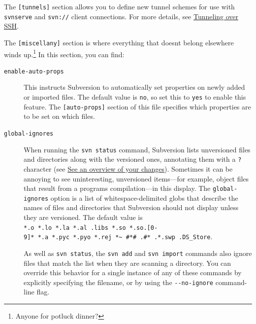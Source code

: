 The \texttt{{[}tunnels{]}} section allows you to define new tunnel
schemes for use with \texttt{svnserve} and \texttt{svn://} client
connections. For more details, see
\hyperref[svn.serverconfig.svnserve.sshauth]{Tunneling over SSH}.

The \texttt{{[}miscellany{]}} section is where everything that
doesn\textquotesingle t belong elsewhere winds up.\footnote{Anyone for
  potluck dinner?} In this section, you can find:

\begin{description}
\item[\texttt{enable-auto-props}]
This instructs Subversion to automatically set properties on newly added
or imported files. The default value is \texttt{no}, so set this to
\texttt{yes} to enable this feature. The \texttt{{[}auto-props{]}}
section of this file specifies which properties are to be set on which
files.
\item[\texttt{global-ignores}]
When running the \texttt{svn\ status} command, Subversion lists
unversioned files and directories along with the versioned ones,
annotating them with a \texttt{?} character (see
\hyperref[svn.tour.cycle.examine.status]{See an overview of your
changes}). Sometimes it can be annoying to see uninteresting,
unversioned items---for example, object files that result from a
program\textquotesingle s compilation---in this display. The
\texttt{global-ignores} option is a list of whitespace-delimited globs
that describe the names of files and directories that Subversion should
not display unless they are versioned. The default value is
\texttt{*.o\ *.lo\ *.la\ *.al\ .libs\ *.so\ *.so.{[}0-9{]}*\ *.a\ *.pyc\ *.pyo\ *.rej\ *\textasciitilde{}\ \#*\#\ .\#*\ .*.swp\ .DS\_Store}.

As well as \texttt{svn\ status}, the \texttt{svn\ add} and
\texttt{svn\ import} commands also ignore files that match the list when
they are scanning a directory. You can override this behavior for a
single instance of any of these commands by explicitly specifying the
filename, or by using the \texttt{-\/-no-ignore} command-line flag.


\end{description}
